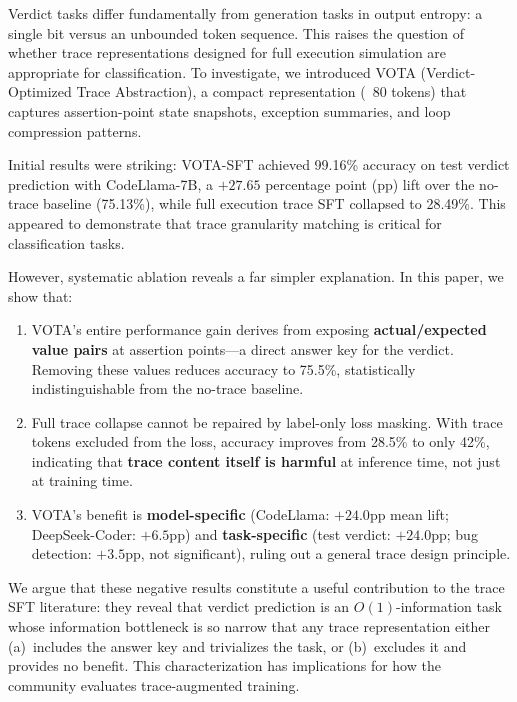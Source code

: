 \documentclass[11pt,a4paper]{article}
\begin{document}
Verdict tasks differ fundamentally from generation tasks in output entropy: a single bit versus an unbounded token sequence. This raises the question of whether trace representations designed for full execution simulation are appropriate for classification. To investigate, we introduced VOTA (Verdict-Optimized Trace Abstraction), a compact representation (~80 tokens) that captures assertion-point state snapshots, exception summaries, and loop compression patterns.

Initial results were striking: VOTA-SFT achieved 99.16\% accuracy on test verdict prediction with CodeLlama-7B, a $+27.65$ percentage point (pp) lift over the no-trace baseline (75.13\%), while full execution trace SFT collapsed to 28.49\%. This appeared to demonstrate that trace granularity matching is critical for classification tasks.

However, systematic ablation reveals a far simpler explanation. In this paper, we show that:

\begin{enumerate}
\item VOTA's entire performance gain derives from exposing \textbf{actual/expected value pairs} at assertion points---a direct answer key for the verdict. Removing these values reduces accuracy to 75.5\%, statistically indistinguishable from the no-trace baseline.

\item Full trace collapse cannot be repaired by label-only loss masking. With trace tokens excluded from the loss, accuracy improves from 28.5\% to only 42\%, indicating that \textbf{trace content itself is harmful} at inference time, not just at training time.

\item VOTA's benefit is \textbf{model-specific} (CodeLlama: $+24.0$pp mean lift; DeepSeek-Coder: $+6.5$pp) and \textbf{task-specific} (test verdict: $+24.0$pp; bug detection: $+3.5$pp, not significant), ruling out a general trace design principle.
\end{enumerate}

We argue that these negative results constitute a useful contribution to the trace SFT literature: they reveal that verdict prediction is an $O(1)$-information task whose information bottleneck is so narrow that any trace representation either (a)~includes the answer key and trivializes the task, or (b)~excludes it and provides no benefit. This characterization has implications for how the community evaluates trace-augmented training.
\end{document}
